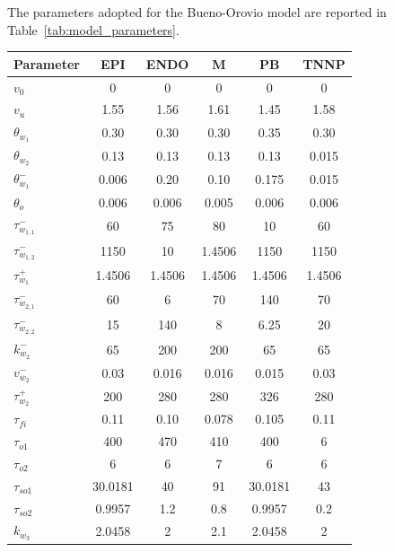 \documentclass{Configuration_Files/PoliMi3i_thesis}
\begin{document}
The parameters adopted for the Bueno-Orovio model are reported in Table~\ref{tab:model_parameters}.
\begin{table}[ht]
\centering
\scriptsize
\setlength{\tabcolsep}{3pt}
\renewcommand{\arraystretch}{0.8}
\begin{tabular}{lccccc}
\toprule
Parameter & EPI & ENDO & M & PB & TNNP \\
\midrule
$v_0$                 & 0      & 0      & 0      & 0      & 0      \\
$v_u$                 & 1.55   & 1.56   & 1.61   & 1.45   & 1.58   \\
$\theta_{w_1}$        & 0.30   & 0.30   & 0.30   & 0.35   & 0.30   \\
$\theta_{w_2}$        & 0.13   & 0.13   & 0.13   & 0.13   & 0.015  \\
$\theta_{w_1}^{-}$    & 0.006  & 0.20   & 0.10   & 0.175  & 0.015  \\
$\theta_{o}$          & 0.006  & 0.006  & 0.005  & 0.006  & 0.006  \\
$\tau_{w_{1,1}}^{-}$   & 60     & 75     & 80     & 10     & 60     \\
$\tau_{w_{1,2}}^{-}$   & 1150   & 10     & 1.4506 & 1150   & 1150   \\
$\tau_{w_1}^{+}$      & 1.4506 & 1.4506 & 1.4506 & 1.4506 & 1.4506 \\
$\tau_{w_{2,1}}^{-}$   & 60     & 6      & 70     & 140    & 70     \\
$\tau_{w_{2,2}}^{-}$   & 15     & 140    & 8      & 6.25   & 20     \\
$k_{w_2}^{-}$         & 65     & 200    & 200    & 65     & 65     \\
$v_{w_2}^{-}$         & 0.03   & 0.016  & 0.016  & 0.015  & 0.03   \\
$\tau_{w_2}^{+}$      & 200    & 280    & 280    & 326    & 280    \\
$\tau_{fi}$           & 0.11   & 0.10   & 0.078  & 0.105  & 0.11   \\
$\tau_{o1}$           & 400    & 470    & 410    & 400    & 6      \\
$\tau_{o2}$           & 6      & 6      & 7      & 6      & 6      \\
$\tau_{so1}$      & 30.0181& 40     & 91     & 30.0181& 43     \\
$\tau_{so2}$      & 0.9957 & 1.2    & 0.8    & 0.9957 & 0.2    \\
$k_{w_3}$             & 2.0458 & 2      & 2.1    & 2.0458 & 2      \\

\end{tabular}
\end{table}
\end{document}
